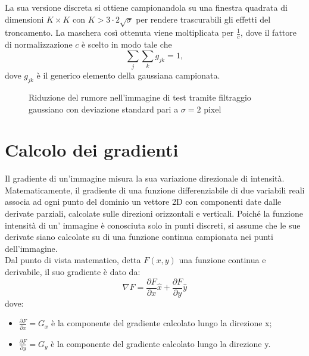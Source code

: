 La sua versione discreta si ottiene campionandola su una finestra quadrata di dimensioni $K \times K$ con $K> 3\cdot 2 \sqrt{\sigma}$ per rendere trascurabili gli effetti del troncamento. 
La maschera così ottenuta viene moltiplicata per $\frac{1}{c}$, dove il fattore di normalizzazione $c$ è  scelto in modo tale che 
\begin{equation}
\label{eq:normalizzazione_gaussiana}
\sum_j\sum_k g_{jk} = 1 ,
\end{equation} 
dove $g_{jk}$ è il generico elemento della gaussiana campionata.


\begin{figure}[!ht]
\centering
{}
\hspace{3mm}
\caption{Riduzione del rumore nell'immagine di test tramite filtraggio gaussiano con deviazione standard pari a $\sigma = 2$ pixel}
\label{fig:immagine_rumore}
\end{figure}


\section{Calcolo dei gradienti}
Il gradiente di un'immagine misura la sua variazione direzionale di intensità.
Matematicamente, il gradiente di una funzione differenziabile di due variabili reali associa ad ogni punto del dominio un vettore 2D con componenti date dalle derivate parziali, calcolate sulle direzioni orizzontali e verticali. 
Poiché la funzione intensità di un' immagine è conosciuta solo in punti discreti, si assume che le sue derivate siano calcolate su di una funzione continua campionata nei punti dell'immagine.
\\

Dal punto di vista matematico, detta $F(x,y)$ una funzione continua e derivabile, il suo gradiente è dato da:
\begin{equation}
\label{eq:gradiente}
\nabla F=\frac{\partial F}{\partial x}\hat x + \frac{\partial F}{\partial y}\hat y
\end{equation}
dove:
\begin{itemize}
\item $\frac{\partial F}{\partial x}=G_{x}$ è la componente del gradiente calcolato lungo la direzione x;
\item $\frac{\partial F}{\partial y}=G_{y}$ è la componente del gradiente calcolato lungo la direzione y.
\end{itemize}

